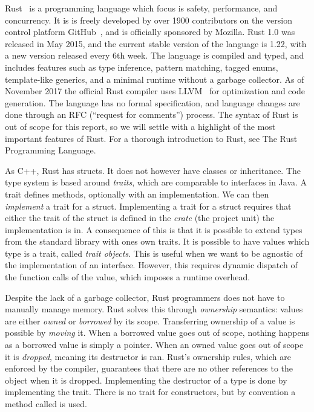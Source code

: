 \documentclass[b5paper]{report}
\begin{document}
Rust~\cite{rust} is a programming language which focus is safety, performance,
and concurrency. It is is freely developed by over 1900 contributors on the
version control platform GitHub~\cite{github}, and is officially sponsored by
Mozilla. Rust 1.0 was released in May 2015, and the current stable version of
the language is 1.22, with a new version released every 6th week. The language
is compiled and typed, and includes features such as type inference, pattern
matching, tagged enums, template-like generics, and a minimal runtime without a
garbage collector. As of November 2017 the official Rust compiler 
uses LLVM~\cite{llvm} for optimization and code generation. The language has no
formal specification, and language changes are done through an RFC (``request
for comments'') process. The syntax of Rust is out of scope for this report, so
we will settle with a highlight of the most important features of Rust. For a
thorough introduction to Rust, see The Rust Programming Language\cite{trpl}.

As C++, Rust has structs. It does not however have classes or inheritance. The
type system is based around \emph{traits}, which are comparable to interfaces in
Java. A trait defines methods, optionally with an implementation. We can then
\emph{implement} a trait for a struct. Implementing a trait for a struct
requires that either the trait of the struct is defined in the \emph{crate} (the
project unit) the implementation is in. A consequence of this is that it is
possible to extend types from the standard library with ones own traits. It is
possible to have values which type is a trait, called \emph{trait objects}. This
is useful when we want to be agnostic of the implementation of an interface.
However, this requires dynamic dispatch of the function calls of the value,
which imposes a runtime overhead.

Despite the lack of a garbage collector, Rust programmers does not have to
manually manage memory. Rust solves this through \emph{ownership} semantics:
values are either \emph{owned} or \emph{borrowed} by its scope. Transferring
ownership of a value is possible by \emph{moving} it. When a borrowed value goes
out of scope, nothing happens as a borrowed value is simply a pointer. When an
owned value goes out of scope it is \emph{dropped}, meaning its destructor is
ran. Rust's ownership rules, which are enforced by the compiler, guarantees that
there are no other references to the object when it is dropped. Implementing the
destructor of a type is done by implementing the  trait. There is no
trait for constructors, but by convention a method called  is used.
\end{document}
